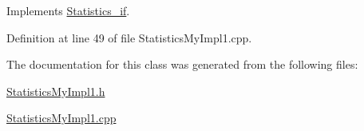 Implements \hyperlink{class_statistics__if_ae0ad6bf18f8263003b0ac7552318be57}{Statistics\-\_\-if}.



Definition at line 49 of file Statistics\-My\-Impl1.\-cpp.



The documentation for this class was generated from the following files\-:\begin{DoxyCompactItemize}
\item 
\hyperlink{_statistics_my_impl1_8h}{Statistics\-My\-Impl1.\-h}\item 
\hyperlink{_statistics_my_impl1_8cpp}{Statistics\-My\-Impl1.\-cpp}\end{DoxyCompactItemize}
